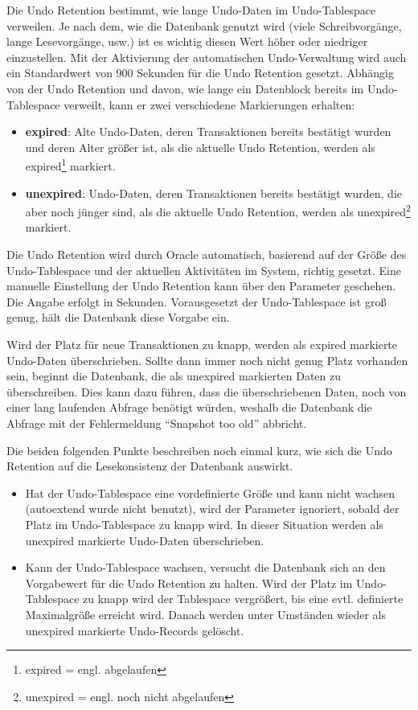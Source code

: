       Die Undo Retention bestimmt, wie lange Undo-Daten im Undo-Tablespace verweilen. Je nach dem, wie die Datenbank genutzt wird (viele Schreibvorg\"ange, lange Lesevorg\"ange, usw.) ist es wichtig diesen Wert h\"oher oder niedriger einzustellen. Mit der Aktivierung der automatischen Undo-Verwaltung wird auch ein Standardwert von 900 Sekunden f\"ur die Undo Retention gesetzt.      Abh\"angig von der Undo Retention und davon, wie lange ein Datenblock bereits im Undo-Tablespace verweilt, kann er zwei verschiedene Markierungen erhalten:
      \begin{itemize}
        \item \textbf{expired}: Alte Undo-Daten, deren Transaktionen bereits best\"atigt wurden und deren Alter gr\"o\ss{}er ist, als die aktuelle Undo Retention, werden als expired\footnote{expired = engl. abgelaufen} markiert.
        \item \textbf{unexpired}: Undo-Daten, deren Transaktionen bereits best\"atigt wurden, die aber noch j\"unger sind, als die aktuelle Undo Retention, werden als unexpired\footnote{unexpired = engl. noch nicht abgelaufen} markiert.
      \end{itemize}

      Die Undo Retention wird durch Oracle automatisch, basierend auf der Gr\"o\ss{}e des Undo-Tablespace und der aktuellen Aktivit\"aten im System, richtig gesetzt. Eine manuelle Einstellung der Undo Retention kann \"uber den Parameter  geschehen. Die Angabe erfolgt in Sekunden. Vorausgesetzt der Undo-Tablespace ist gro\ss{} genug, h\"alt die Datenbank diese Vorgabe ein.

      Wird der Platz f\"ur neue Transaktionen zu knapp, werden als expired markierte Undo-Daten \"uberschrieben. Sollte dann immer noch nicht genug Platz vorhanden sein, beginnt die Datenbank, die als unexpired markierten Daten zu \"uberschreiben. Dies kann dazu f\"uhren, dass die \"uberschriebenen Daten, noch von einer lang laufenden Abfrage ben\"otigt w\"urden, weshalb die Datenbank die Abfrage mit der Fehlermeldung \enquote{Snapshot too old} abbricht.

      Die beiden folgenden Punkte beschreiben noch einmal kurz, wie sich die Undo Retention auf die Lesekonsistenz der Datenbank auswirkt.
\clearpage
			\begin{itemize}
        \item Hat der Undo-Tablespace eine vordefinierte Gr\"o\ss{}e und kann nicht wachsen (autoextend wurde nicht benutzt), wird der Parameter  ignoriert, sobald der Platz im Undo-Tablespace zu knapp wird. In dieser Situation werden als unexpired markierte Undo-Daten \"uberschrieben.
        \item Kann der Undo-Tablespace wachsen, versucht die Datenbank sich an den Vorgabewert f\"ur die Undo Retention zu halten. Wird der Platz im Undo-Tablespace zu knapp wird der Tablespace vergr\"o\ss{}ert, bis eine evtl. definierte Maximalgr\"o\ss{}e erreicht wird. Danach werden unter Umst\"anden wieder als unexpired markierte Undo-Records gel\"oscht.
      \end{itemize}
